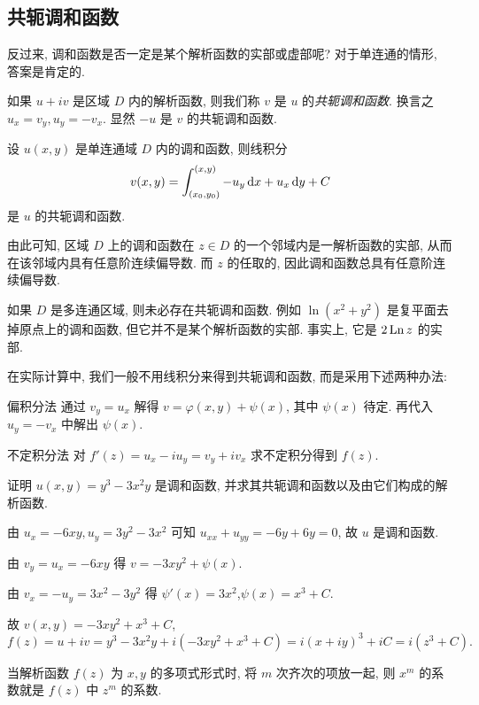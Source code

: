 \subsection{共轭调和函数}

反过来, 调和函数是否一定是某个解析函数的实部或虚部呢?
对于单连通的情形, 答案是肯定的.

如果 $u+iv$ 是区域 $D$ 内的解析函数, 则我们称 $v$ 是 $u$ 的\emph{共轭调和函数}.
换言之 $u_x=v_y,u_y=-v_x$.
显然 $-u$ 是 $v$ 的共轭调和函数.
\begin{theorem}
	设 $u(x,y)$ 是单连通域 $D$ 内的调和函数, 则线积分
	\[v(x,y)=\int_{(x_0,y_0)}^{(x,y)}-u_y\,\mathrm{d} x+u_x\,\mathrm{d} y+C\]
	是 $u$ 的共轭调和函数.
\end{theorem}
由此可知, 区域 $D$ 上的调和函数在 $z\in D$ 的一个邻域内是一解析函数的实部, 从而在该邻域内具有任意阶连续偏导数.
而 $z$ 的任取的, 因此调和函数总具有任意阶连续偏导数.

如果 $D$ 是多连通区域, 则未必存在共轭调和函数.
例如 $\ln(x^2+y^2)$ 是复平面去掉原点上的调和函数, 但它并不是某个解析函数的实部.
事实上, 它是 $2\operatorname{Ln} z$ 的实部.

在实际计算中, 我们\alert{一般不用线积分}来得到共轭调和函数, 而是采用下述两种办法:
\begin{theorem}{偏积分法}
	通过 $v_y=u_x$ 解得 $v=\varphi(x,y)+\psi(x)$, 其中 $\psi(x)$ 待定.
	{再代入 $u_y=-v_x$ 中解出 $\psi(x)$.}
\end{theorem}
\begin{theorem}{不定积分法}
	对 $f'(z)=u_x-iu_y=v_y+iv_x$ 求不定积分得到 $f(z)$.
\end{theorem}

\begin{example}
	证明 $u(x,y)=y^3-3x^2y$ 是调和函数, 并求其共轭调和函数以及由它们构成的解析函数.
\end{example}

\begin{solution}
	由 $u_x=-6xy,u_y=3y^2-3x^2$ 可知 $u_{xx}+u_{yy}=-6y+6y=0$,
	{故 $u$ 是调和函数.}

	{由 $v_y=u_x=-6xy$ 得 $v=-3xy^2+\psi(x)$.}

	{由 $v_x=-u_y=3x^2-3y^2$ 得 $\psi'(x)=3x^2$,$\psi(x)=x^3+C$.}

	{故 $v(x,y)=-3xy^2+x^3+C$,
	\[
		f(z)=u+iv=y^3-3x^2y+i(-3xy^2+x^3+C)
		{=i(x+iy)^3+iC=i(z^3+C).}
	\]}
\end{solution}

当解析函数 $f(z)$ 为 $x,y$ 的多项式形式时, 将 $m$ 次齐次的项放一起, 则 $x^m$ 的系数就是 $f(z)$ 中 $z^m$ 的系数.

